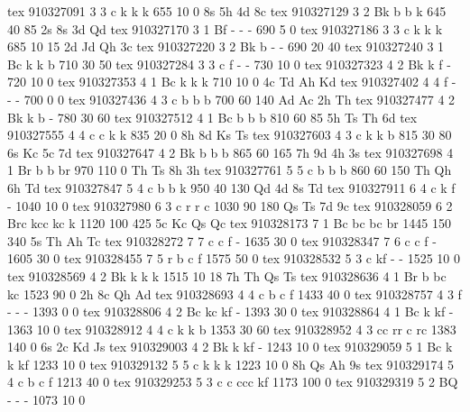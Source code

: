 tex       910327091  3  3 c   k     k     k          655   10    0 8s 5h 4d 8c
tex       910327129  3  2 Bk  b     b     k          645   40   85 2s 8s 3d Qd
tex       910327170  3  1 Bf  -     -     -          690    5    0 
tex       910327186  3  3 c   k     k     k          685   10   15 2d Jd Qh 3c
tex       910327220  3  2 Bk  b     -     -          690   20   40 
tex       910327240  3  1 Bc  k     k     b          710   30   50 
tex       910327284  3  3 c   f     -     -          730   10    0 
tex       910327323  4  2 Bk  k     f     -          720   10    0 
tex       910327353  4  1 Bc  k     k     k          710   10    0 4c Td Ah Kd
tex       910327402  4  4 f   -     -     -          700    0    0 
tex       910327436  4  3 c   b     b     b          700   60  140 Ad Ac 2h Th
tex       910327477  4  2 Bk  k     b     -          780   30   60 
tex       910327512  4  1 Bc  b     b     b          810   60   85 5h Ts Th 6d
tex       910327555  4  4 c   c     k     k          835   20    0 8h 8d Ks Ts
tex       910327603  4  3 c   k     k     b          815   30   80 6s Kc 5c 7d
tex       910327647  4  2 Bk  b     b     b          865   60  165 7h 9d 4h 3s
tex       910327698  4  1 Br  b     b     br         970  110    0 Th Ts 8h 3h
tex       910327761  5  5 c   b     b     b          860   60  150 Th Qh 6h Td
tex       910327847  5  4 c   b     b     k          950   40  130 Qd 4d 8s Td
tex       910327911  6  4 c   k     f     -         1040   10    0 
tex       910327980  6  3 c   r     r     c         1030   90  180 Qs Ts 7d 9c
tex       910328059  6  2 Brc kcc   kc    k         1120  100  425 5c Kc Qs Qc
tex       910328173  7  1 Bc  bc    bc    br        1445  150  340 5s Th Ah Tc
tex       910328272  7  7 c   c     f     -         1635   30    0 
tex       910328347  7  6 c   c     f     -         1605   30    0 
tex       910328455  7  5 r   b     c     f         1575   50    0 
tex       910328532  5  3 c   kf    -     -         1525   10    0 
tex       910328569  4  2 Bk  k     k     k         1515   10   18 7h Th Qs Ts
tex       910328636  4  1 Br  b     bc    kc        1523   90    0 2h 8c Qh Ad
tex       910328693  4  4 c   b     c     f         1433   40    0 
tex       910328757  4  3 f   -     -     -         1393    0    0 
tex       910328806  4  2 Bc  kc    kf    -         1393   30    0 
tex       910328864  4  1 Bc  k     kf    -         1363   10    0 
tex       910328912  4  4 c   k     k     b         1353   30   60 
tex       910328952  4  3 cc  rr    c     rc        1383  140    0 6s 2c Kd Js
tex       910329003  4  2 Bk  k     kf    -         1243   10    0 
tex       910329059  5  1 Bc  k     k     kf        1233   10    0 
tex       910329132  5  5 c   k     k     k         1223   10    0 8h Qs Ah 9s
tex       910329174  5  4 c   b     c     f         1213   40    0 
tex       910329253  5  3 c   c     ccc   kf        1173  100    0 
tex       910329319  5  2 BQ  -     -     -         1073   10    0 
